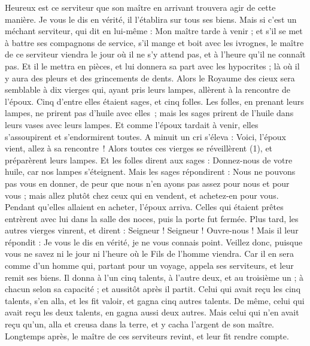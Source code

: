 \begin{multicols}{2}
{Heureux est ce serviteur que son maître en arrivant trouvera agir de cette manière.
Je vous le dis en vérité, il l'établira sur tous ses biens.
Mais si c'est un méchant serviteur, qui dit en lui-même : Mon maître tarde à venir ;
et s’il se met à battre ses compagnons de service, s’il mange et boit avec les ivrognes,
le maître de ce serviteur viendra le jour où il ne s’y attend pas, et à l'heure qu'il ne connaît pas.
Et il le mettra en pièces, et lui donnera sa part avec les hypocrites ; là où il y aura des pleurs et des grincements de dents.
\VerseOne{}Alors le Royaume des cieux sera semblable à dix vierges qui, ayant pris leurs lampes, allèrent à la rencontre de l'époux.
Cinq d’entre elles étaient sages, et cinq folles.
Les folles, en prenant leurs lampes, ne prirent pas d'huile avec elles ;
mais les sages prirent de l'huile dans leurs vases avec leurs lampes.
Et comme l'époux tardait à venir, elles s’assoupirent et s'endormirent toutes.
A minuit un cri s’éleva : Voici, l'époux vient, allez à sa rencontre !
Alors toutes ces vierges se réveillèrent (1), et préparèrent leurs lampes.
Et les folles dirent aux sages : Donnez-nous de votre huile, car nos lampes s'éteignent.
Mais les sages répondirent : Nous ne pouvons pas vous en donner, de peur que nous n'en ayons pas assez pour nous et pour vous ; mais allez plutôt chez ceux qui en vendent, et achetez-en pour vous.
Pendant qu'elles allaient en acheter, l'époux arriva. Celles qui étaient prêtes entrèrent avec lui dans la salle des noces, puis la porte fut fermée.
Plus tard, les autres vierges vinrent, et dirent : Seigneur ! Seigneur ! Ouvre-nous !
Mais il leur répondit : Je vous le dis en vérité, je ne vous connais point.
Veillez donc, puisque vous ne savez ni le jour ni l'heure où le Fils de l'homme viendra.
Car il en sera comme d'un homme qui, partant pour un voyage, appela ses serviteurs, et leur remit ses biens.
Il donna à l'un cinq talents, à l'autre deux, et au troisième un ; à chacun selon sa capacité ; et aussitôt après il partit.
Celui qui avait reçu les cinq talents, s'en alla, et les fit valoir, et gagna cinq autres talents.
De même, celui qui avait reçu les deux talents, en gagna aussi deux autres.
Mais celui qui n'en avait reçu qu'un, alla et creusa dans la terre, et y cacha l'argent de son maître.
Longtemps après, le maître de ces serviteurs revint, et leur fit rendre compte.
}
\end{multicols}
